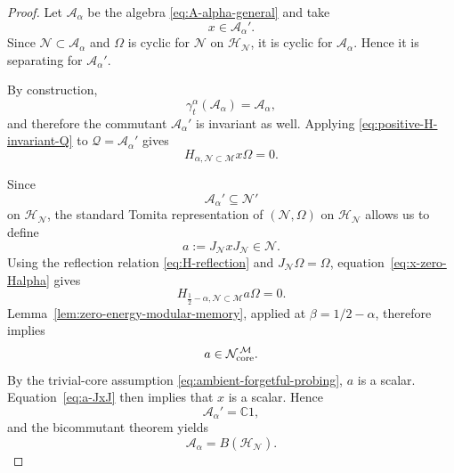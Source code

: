 \documentclass[a4paper,11pt]{article}
\theoremstyle{definition}
\newcommand{\mN}{\mathcal{N}}
\newcommand{\mH}{\mathcal{H}}
\newcommand{\mM}{\mathcal{M}}
\begin{document}
\begin{proof}
Let $\mathcal A_\alpha$ be the algebra
\eqref{eq:A-alpha-general} and take
\begin{equation}
    x\in\mathcal A_\alpha'.
\end{equation}
Since $\mN\subset\mathcal A_\alpha$ and $\Omega$ is cyclic for
$\mN$ on $\mH_{\mN}$, it is cyclic for $\mathcal A_\alpha$.
Hence it is separating for $\mathcal A_\alpha'$.

By construction,
\begin{equation}
    \gamma_t^\alpha(\mathcal A_\alpha)
    =
    \mathcal A_\alpha,
\end{equation}
and therefore the commutant $\mathcal A_\alpha'$ is invariant as well.
Applying \eqref{eq:positive-H-invariant-Q} to
$\mathcal Q=\mathcal A_\alpha'$ gives
\begin{equation}
    H_{\alpha,\mN\subset\mM}x\Omega=0.
    \label{eq:x-zero-Halpha}
\end{equation}

Since
\begin{equation}
    \mathcal A_\alpha'\subseteq\mN'
\end{equation}
on $\mH_{\mN}$, the standard Tomita representation of $(\mN,\Omega)$ on
$\mH_{\mN}$ allows us to define
\begin{equation}
    a:=J_{\mN}xJ_{\mN}\in\mN.
    \label{eq:a-JxJ}
\end{equation}
Using the reflection relation \eqref{eq:H-reflection} and
$J_{\mN}\Omega=\Omega$, equation~\eqref{eq:x-zero-Halpha} gives
\begin{equation}
    H_{\frac12-\alpha,\mN\subset\mM}a\Omega=0.
    \label{eq:a-zero-Hbeta}
\end{equation}
Lemma~\ref{lem:zero-energy-modular-memory}, applied at
$\beta=1/2-\alpha$, therefore implies
\begin{equation}
    a\in
    \mN_{\rm core}^{\,\mM}.
\end{equation}
By the trivial-core assumption \eqref{eq:ambient-forgetful-probing},
$a$ is a scalar. Equation~\eqref{eq:a-JxJ} then implies that $x$ is a
scalar. Hence
\begin{equation}
    \mathcal A_\alpha'=\mathbb C1,
\end{equation}
and the bicommutant theorem yields
\begin{equation}
    \mathcal A_\alpha=B(\mH_{\mN}).
\end{equation}
\end{proof}
\end{document}
